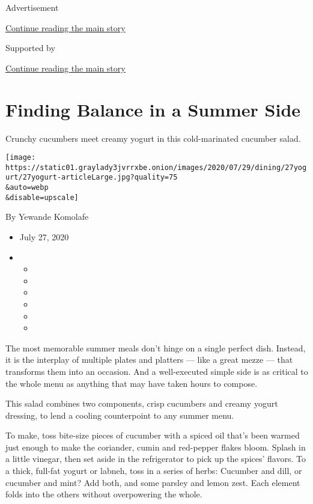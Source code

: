 Advertisement

\protect\hyperlink{after-top}{Continue reading the main story}

Supported by

\protect\hyperlink{after-sponsor}{Continue reading the main story}

\hypertarget{finding-balance-in-a-summer-side}{%
\section{Finding Balance in a Summer
Side}\label{finding-balance-in-a-summer-side}}

Crunchy cucumbers meet creamy yogurt in this cold-marinated cucumber
salad.

\texttt{[image: https://static01.graylady3jvrrxbe.onion/images/2020/07/29/dining/27yogurt/27yogurt-articleLarge.jpg?quality=75\\\&auto=webp\\\&disable=upscale]}

By Yewande Komolafe

\begin{itemize}
\item
  July 27, 2020
\item
  \begin{itemize}
  \item
  \item
  \item
  \item
  \item
  \item
  \end{itemize}
\end{itemize}

The most memorable summer meals don't hinge on a single perfect dish.
Instead, it is the interplay of multiple plates and platters --- like a
great mezze --- that transforms them into an occasion. And a
well-executed simple side is as critical to the whole menu as anything
that may have taken hours to compose.

This salad combines two components, crisp cucumbers and creamy yogurt
dressing, to lend a cooling counterpoint to any summer menu.

To make, toss bite-size pieces of cucumber with a spiced oil that's been
warmed just enough to make the coriander, cumin and red-pepper flakes
bloom. Splash in a little vinegar, then set aside in the refrigerator to
pick up the spices' flavors. To a thick, full-fat yogurt or labneh, toss
in a series of herbs: Cucumber and dill, or cucumber and mint? Add both,
and some parsley and lemon zest. Each element folds into the others
without overpowering the whole.

